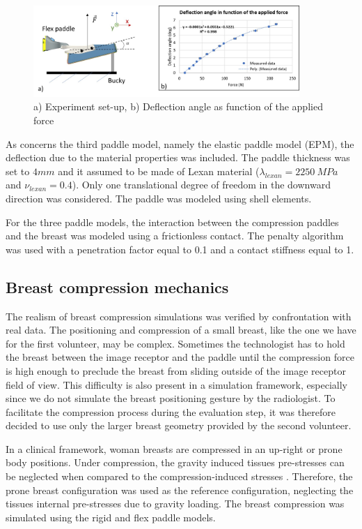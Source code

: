 \begin{figure}[!h]
\centering
\includegraphics[width=0.9\textwidth,keepaspectratio]{figures/deflectionAngle.jpg} 
\caption{ a) Experiment set-up, b) Deflection angle as function of the applied force }\label{fig:deflectionangle}
\end{figure}

As concerns the third paddle model, namely the elastic paddle model (EPM), the deflection due to the material properties was included. The paddle thickness was set to $4mm$ and it assumed to be made of Lexan material ($\lambda_{lexan}= 2250 \ MPa$ and $\nu_{lexan}= 0.4$).   Only one translational degree of freedom in the downward direction was considered. The paddle was modeled using shell elements. 

For the three paddle models, the interaction between the compression paddles and the breast was modeled using a frictionless contact. The penalty algorithm was used with a penetration factor equal to 0.1 and a contact stiffness equal to 1. 
 
\subsection{Breast compression mechanics}

The realism of breast compression simulations was verified by confrontation with real data. The positioning and compression of a small breast, like the one we have for the first volunteer, may be complex. Sometimes the technologist has to hold the breast between the image receptor and the paddle until the compression force is high enough to preclude the breast from sliding outside of the image receptor field of view. This difficulty is also present in a simulation framework, especially since we do not simulate the breast positioning gesture by the radiologist. To facilitate the compression process during the evaluation step, it was therefore decided to use only the larger breast geometry  provided by the second volunteer.

In a clinical framework, woman breasts are compressed in an up-right or prone body positions. Under compression, the gravity induced tissues pre-stresses can be neglected when compared to the compression-induced stresses \citep{han_development_2012, ruiter_model_based_2006, sturgeon_finite_element_2016}.  Therefore, the prone breast configuration was used as the reference configuration, neglecting the tissues internal pre-stresses due to gravity loading. The breast compression was simulated using the rigid and flex paddle models. 

